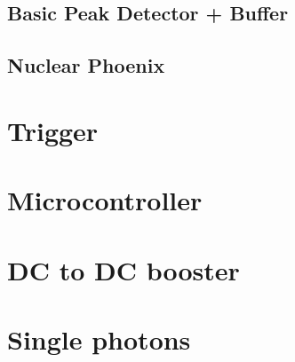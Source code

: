 \subsection{Basic Peak Detector + Buffer}\label{sec:basic_buffer}

\subsection{Nuclear Phoenix}\label{sec:nuclear_phoenix}

\cite{Nucelar_phoenix}

\section{Trigger}

\section{Microcontroller}

\section{DC to DC booster}

\section{Single photons}